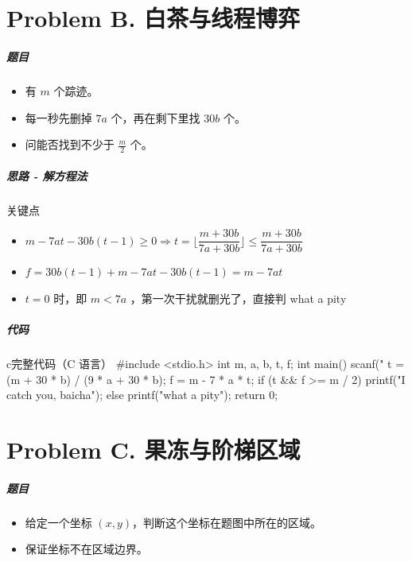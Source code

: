 \documentclass[
     aspectratio=169,                   %
]{beamer}
\begin{document}

\part{Problem B. 白茶与线程博弈}
\begin{frame}
	\frametitle{题目}
	\begin{itemize}
		\item 有 $m$ 个踪迹。
		\item 每一秒先删掉 $7a$ 个，再在剩下里找 $30b$ 个。
		\item 问能否找到不少于 $\frac{m}{2}$ 个。
	\end{itemize}
\end{frame}

\begin{frame}
	\frametitle{思路 - 解方程法}
	 \begin{exampleblock}{关键点}
	 	\begin{itemize}
			\item $m-7at-30b(t-1) \ge 0 \Rightarrow t=\lfloor\dfrac{m+30b}{7a+30b}\rfloor \le  \dfrac{m+30b}{7a+30b}$
			\item $f=30b(t-1)+m-7at-30b(t-1)=m-7at$
			\item $t=0$ 时，即 $m < 7a$ ，第一次干扰就删光了，直接判 what a pity
		\end{itemize}
	\end{exampleblock}
\end{frame}

\begin{frame}[fragile]
	\frametitle{代码}
	\begin{codeblock}{c}{完整代码（C 语言）}
#include <stdio.h>
int m, a, b, t, f;
int main()
{
    scanf("%
    t = (m + 30 * b) / (9 * a + 30 * b);
    f = m - 7 * a * t;
    if (t && f >= m / 2)
        printf("I catch you, baicha");
    else
        printf("what a pity");
    return 0;
}
\end{codeblock}
\end{frame}


\part{Problem C. 果冻与阶梯区域}
\begin{frame}
	\frametitle{题目}
	\begin{itemize}
		\item 给定一个坐标 $(x,y)$，判断这个坐标在题图中所在的区域。
		\item 保证坐标不在区域边界。
	\end{itemize}
\end{frame}
\end{document}
